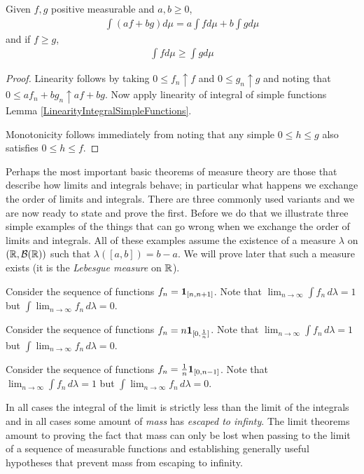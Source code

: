 \begin{lem}Given $f,g$ positive measurable and $a,b \geq 0$, 
\begin{align*}
\int \left ( a f + b g \right ) d \mu = a \int f d \mu + b \int g d \mu
\end{align*}
and if $f \geq g$,
\begin{align*}
\int f  d \mu \geq \int g d \mu
\end{align*}
\end{lem}
\begin{proof}Linearity follows by taking $0 \leq f_n \uparrow f$ and
  $0 \leq g_n \uparrow g$ and noting that $0 \leq a f_n + b g_n
  \uparrow a f + b g$.  Now apply linearity of integral of simple
  functions Lemma \ref{LinearityIntegralSimpleFunctions}.

Monotonicity follows immediately from noting that any simple $0 \leq h
\leq g$ also satisfies $0 \leq h \leq f$.
\end{proof}
Perhaps the most important basic theorems of measure theory are those
that describe how limits and integrals behave; in particular what
happens we exchange the order of limits and integrals.  There are three
commonly used variants and we are now ready to state and prove the
first.  Before we do that we illustrate three simple examples of the
things that can go wrong when we exchange the order of limits and
integrals.  All of these examples assume the existence of a measure
$\lambda$ on
$(\mathbb{R},\mathcal{B}(\mathbb{R}))$ such that $\lambda([a,b]) = b -a$.  We
will prove later that such a measure exists (it is the \emph{Lebesgue
  measure} on $\mathbb{R}$).
\begin{examp}Consider the sequence of functions 
$f_n = \textbf{1}_{[n,n+1]}$.  Note that $\lim_{n \to \infty}
\int f_n \, d \lambda = 1$ but $\int \lim_{n \to \infty}  f_n \, d
\lambda = 0$.
\end{examp}
\begin{examp}Consider the sequence of functions 
$f_n = n \textbf{1}_{[0,\frac{1}{n}]}$.  Note that $\lim_{n \to \infty}
\int f_n \, d \lambda = 1$ but $\int \lim_{n \to \infty}  f_n \, d
\lambda = 0$.
\end{examp}
\begin{examp}Consider the sequence of functions 
$f_n = \frac{1}{n}\textbf{1}_{[0,n-1]}$.  Note that $\lim_{n \to \infty}
\int f_n \, d \lambda = 1$ but $\int \lim_{n \to \infty}  f_n \, d
\lambda = 0$.
\end{examp}
 In all cases the integral of the limit is strictly less than the limit
of the integrals and in all cases some amount of \emph{mass} has
\emph{escaped to infinty}.  The limit theorems amount to proving the
fact that mass can only be lost when passing to the limit of a
sequence of measurable functions and establishing generally useful
hypotheses that prevent mass from escaping to infinity.

